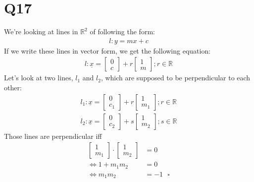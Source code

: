 \documentclass{article}
\renewcommand{\vec}{\underline}
\begin{document}
\section*{Q17}
We're looking at lines in $\mathbb{R}^2$ of following the form:
\begin{align}
    l: y = mx + c
\end{align}
If we write these lines in vector form, we get the following equation:
\begin{align}
    l: \vec x =
    \begin{bmatrix}
        0\\
        c
    \end{bmatrix}
    + r \begin{bmatrix}
        1\\
        m
    \end{bmatrix};
    r \in \mathbb{R}
\end{align}
Let's look at two lines, $l_1$ and $l_2$, which are supposed to be perpendicular to each other:
\begin{align}
    l_1: \vec x =
    \begin{bmatrix}
        0\\
        c_1
    \end{bmatrix}
    + r \begin{bmatrix}
        1\\
        m_1
    \end{bmatrix};
    r \in \mathbb{R}\\
    l_2: \vec x =
    \begin{bmatrix}
        0\\
        c_2
    \end{bmatrix}
    + s \begin{bmatrix}
        1\\
        m_2
    \end{bmatrix};
    s \in \mathbb{R}   
\end{align}
Those lines are perpendicular iff
\begin{align}
    \begin{bmatrix}
        1\\m_1
    \end{bmatrix}
    \cdot \begin{bmatrix}
        1\\m_2
    \end{bmatrix}
    &= 0\\
    \Leftrightarrow 1+m_1m_2 &=0\\ \Leftrightarrow m_1m_2 &= -1\:\:\:\square
\end{align}
\end{document}
